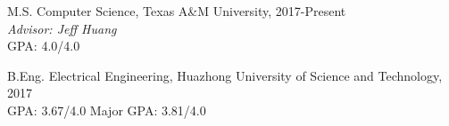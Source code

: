 \documentclass[12pt,letterpaper]{report}
\begin{document}
	\begin{tablist}
		
		
		\item[M.S.]  \tab Computer Science, Texas A\&M University, 2017-Present \\
		\textit{Advisor: Jeff Huang}\\
		GPA: 4.0/4.0
		
		\item[B.Eng.]  \tab Electrical Engineering, Huazhong University of Science and Technology, 2017 \\
		GPA: 3.67/4.0 \hspace{0.5cm} Major GPA: 3.81/4.0
				
	\end{tablist}
	
	
	
%	
%		
%		
%		
%		
%		


	
\end{document}
